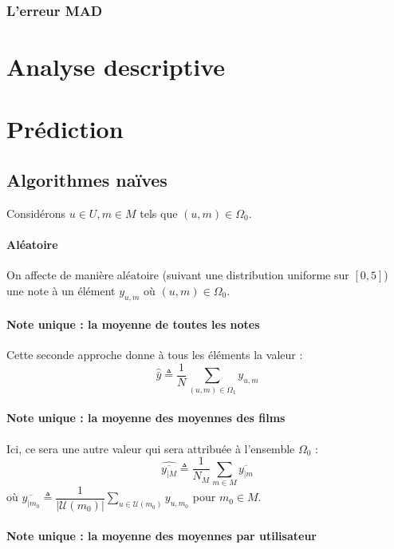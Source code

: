 \documentclass[a4paper, 11pt]{book}
\begin{document}
\subsection{L'erreur MAD}

\chapter{Analyse descriptive}

\chapter{Prédiction}

\section{Algorithmes naïves}

Considérons $u \in U, m \in M$ tels que $(u,m) \in \Omega_0$.

\subsubsection{Aléatoire}

On affecte de manière aléatoire (suivant une distribution uniforme sur $[0,5]$) une note à un élément $y_{u,m}$ où $(u,m) \in \Omega_0$.

\subsubsection{Note unique : la moyenne de toutes les notes}

Cette seconde approche donne à tous les éléments la valeur : 
$$\hat{\overline{y}} \triangleq \displaystyle \dfrac{1}{N} \sum \limits_{(u,m) \in \Omega_1} y_{u,m}$$

\subsubsection{Note unique : la moyenne des moyennes des films}

Ici, ce sera une autre valeur qui sera attribuée à l'ensemble $\Omega_0$ : 
$$\hat{\overline{y_{|M}}}  \triangleq \displaystyle \dfrac{1}{N_M} \sum \limits_{m \in M} \overline{y_{|m}}$$
où  $\overline{y_{|m_0}} \triangleq \displaystyle \dfrac{1}{|\mathcal{U}(m_0)|} \sum \limits_{u \in \mathcal{U}(m_0) } y_{u,m_0}$ pour $m_0 \in M$.

\subsubsection{Note unique : la moyenne des moyennes par utilisateur}
\end{document}
